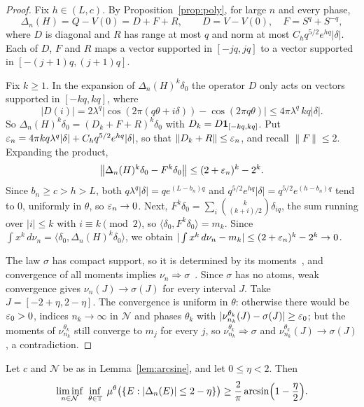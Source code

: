 \begin{proof}
Fix $h\in(L,c)$. By Proposition~\ref{prop:poly}, for large $n$ and every phase,
\[
\Delta_n(H)=Q-V(0)=D+F+R,\qquad D=V-V(0),\quad F=S^q+S^{-q},
\]
where $D$ is diagonal and $R$ has range at most $q$ and norm at most $C_hq^{5/2}e^{hq}|\delta|$. Each of $D$, $F$ and $R$ maps a vector supported in $[-jq,jq]$ to a vector supported in $[-(j+1)q,(j+1)q]$.

Fix $k\ge1$. In the expansion of $\Delta_n(H)^k\delta_0$ the operator $D$ only acts on vectors supported in $[-kq,kq]$, where
\[
|D(i)|=2\lambda^q\bigl|\cos(2\pi(q\theta+i\delta))-\cos(2\pi q\theta)\bigr|\le4\pi\lambda^q\,kq|\delta|.
\]
So $\Delta_n(H)^k\delta_0=(D_k+F+R)^k\delta_0$ with $D_k=D\mathbf 1_{[-kq,kq]}$. Put $\varepsilon_n=4\pi kq\lambda^q|\delta|+C_hq^{5/2}e^{hq}|\delta|$, so that $\|D_k+R\|\le\varepsilon_n$, and recall $\|F\|\le2$. Expanding the product,
\[
\bigl\|\Delta_n(H)^k\delta_0-F^k\delta_0\bigr\|\le(2+\varepsilon_n)^k-2^k .
\]
Since $b_n\ge c>h>L$, both $q\lambda^q|\delta|=qe^{(L-b_n)q}$ and $q^{5/2}e^{hq}|\delta|=q^{5/2}e^{(h-b_n)q}$ tend to $0$, uniformly in $\theta$, so $\varepsilon_n\to0$. Next, $F^k\delta_0=\sum_i\binom{k}{(k+i)/2}\delta_{iq}$, the sum running over $|i|\le k$ with $i\equiv k\pmod 2$, so $\langle\delta_0,F^k\delta_0\rangle=m_k$. Since $\int x^k\,d\nu_n=\langle\delta_0,\Delta_n(H)^k\delta_0\rangle$, we obtain $|\int x^k\,d\nu_n-m_k|\le(2+\varepsilon_n)^k-2^k\to0$.

The law $\sigma$ has compact support, so it is determined by its moments~\cite[Theorem~30.1]{Billingsley1995}, and convergence of all moments implies $\nu_n\Rightarrow\sigma$~\cite[Theorem~30.2]{Billingsley1995}. Since $\sigma$ has no atoms, weak convergence gives $\nu_n(J)\to\sigma(J)$ for every interval $J$. Take $J=[-2+\eta,2-\eta]$. The convergence is uniform in $\theta$: otherwise there would be $\varepsilon_0>0$, indices $n_k\to\infty$ in $\mathcal N$ and phases $\theta_k$ with $|\nu^{\theta_k}_{n_k}(J)-\sigma(J)|\ge\varepsilon_0$; but the moments of $\nu^{\theta_k}_{n_k}$ still converge to $m_j$ for every $j$, so $\nu^{\theta_k}_{n_k}\Rightarrow\sigma$ and $\nu^{\theta_k}_{n_k}(J)\to\sigma(J)$, a contradiction.
\end{proof}

\begin{lemma}\label{lem:arcsineunif}
Let $c$ and $\mathcal N$ be as in Lemma~\ref{lem:arcsine}, and let $0\le\eta<2$. Then
\[
\liminf_{n\in\mathcal N}\ \inf_{\theta\in\T}\ \mu^\theta\bigl(\{E:|\Delta_n(E)|\le2-\eta\}\bigr)\ge\frac2\pi\arcsin\Bigl(1-\frac\eta2\Bigr).
\]
\end{lemma}

